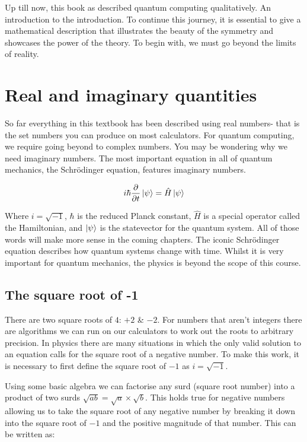 \documentclass{book}
\begin{document}
Up till now, this book as described quantum computing qualitatively. An introduction to the introduction. To continue this journey, it is essential to give a mathematical description that illustrates the beauty of the symmetry and showcases the power of the theory. To begin with, we must go beyond the limits of reality. 

\section{Real and imaginary quantities}

So far everything in this textbook has been described using real numbers- that is the set numbers you can produce on most calculators. For quantum computing, we require going beyond to complex numbers. You may be wondering why we need imaginary numbers. The most important equation in all of quantum mechanics, the Schrödinger equation, features imaginary numbers. 

$$ i\hbar \frac{\partial{}}{\partial{t}}\ket{\psi} = \hat{H}\ket{\psi} $$

Where $i = \sqrt{-1}$, $\hbar$ is the reduced Planck constant, $\hat{H}$ is a special operator called the Hamiltonian, and $\ket{\psi}$ is the statevector for the quantum system. All of those words will make more sense in the coming chapters. The iconic Schrödinger equation describes how quantum systems change with time. Whilst it is very important for quantum mechanics, the physics is beyond the scope of this course. 

\subsection{ The square root of -1}

There are two square roots of $4$: $+2$ \& $-2$. For numbers that aren't integers there are algorithms we can run on our calculators to work out the roots to arbitrary precision. In physics there are many situations in which the only valid solution to an equation calls for the square root of a negative number. To make this work, it is necessary to first define the square root of $-1$ as $i = \sqrt{-1}$. 

Using some basic algebra we can factorise any surd (square root number) into a product of two surds $ \sqrt{ab} = \sqrt{a} \times \sqrt{b}$. This holds true for negative numbers allowing us to take the square root of any negative number by breaking it down into the square root of $-1$ and the positive magnitude of that number. This can be written as:
\end{document}
